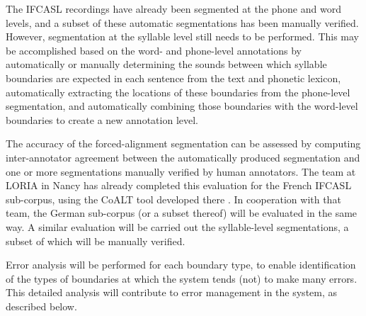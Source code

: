 	The IFCASL recordings have already been segmented at the phone and word levels, and a subset of these automatic segmentations has been manually verified. However, segmentation at the syllable level still needs to be performed. This may be accomplished based on the word- and phone-level annotations by automatically or manually determining the sounds between which syllable boundaries are expected in each sentence from the text and phonetic lexicon, automatically extracting the locations of these boundaries from the phone-level segmentation, and automatically combining those boundaries with the word-level boundaries to create a new annotation level. 
	
	
	
	The accuracy of the forced-alignment segmentation can be assessed by computing inter-annotator agreement between the automatically produced segmentation and one or more segmentations manually verified by human annotators. The team at LORIA in Nancy has already completed this evaluation for the French IFCASL sub-corpus, using the CoALT tool developed there \citep{Fohr2012}. In cooperation with that team, the German sub-corpus (or a subset thereof) will be evaluated in the same way.
	A similar evaluation will be carried out the syllable-level segmentations, a subset of which will be manually verified.
	
	Error analysis will be performed for each boundary type, to enable identification of the types of boundaries at which the system tends (not) to make many errors. This detailed analysis will contribute to error management in the system, as described 
below.

	
